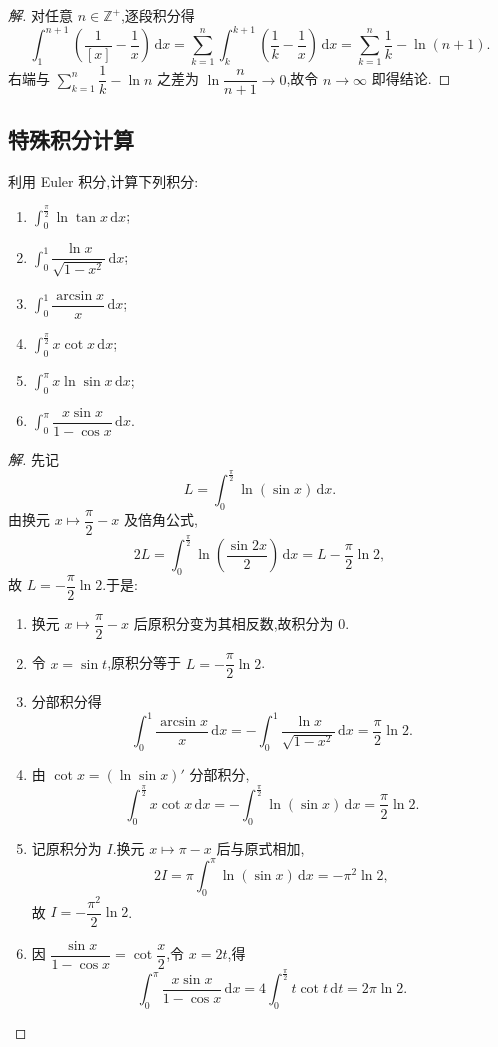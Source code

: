 \documentclass[../../数学分析培优讲义(答案版).tex]{subfiles}
\begin{document}
\begin{proof}[解]
对任意 $n\in\mathbb{Z}^+$,逐段积分得
\[
    \int_1^{n+1}\left(\dfrac{1}{[x]}-\dfrac{1}{x}\right)\,\mathrm{d}x
    =\sum\limits_{k=1}^{n}\int_k^{k+1}\left(\dfrac{1}{k}-\dfrac{1}{x}\right)\,\mathrm{d}x
    =\sum\limits_{k=1}^{n}\dfrac{1}{k}-\ln(n+1).
\]
右端与 $\displaystyle\sum\limits_{k=1}^{n}\dfrac{1}{k}-\ln n$ 之差为
$\ln\dfrac{n}{n+1}\to0$,故令 $n\to\infty$ 即得结论.
\end{proof}

\subsection{特殊积分计算}

\begin{example}
利用 Euler 积分,计算下列积分:
\begin{enumerate}[label=(\arabic*)]
    \item $\displaystyle\int_0^{\frac{\pi}{2}}\ln\tan x\,\mathrm{d}x$;
    \item $\displaystyle\int_0^1\dfrac{\ln x}{\sqrt{1-x^2}}\,\mathrm{d}x$;
    \item $\displaystyle\int_0^1\dfrac{\arcsin x}{x}\,\mathrm{d}x$;
    \item $\displaystyle\int_0^{\frac{\pi}{2}}x\cot x\,\mathrm{d}x$;
    \item $\displaystyle\int_0^\pi x\ln\sin x\,\mathrm{d}x$;
    \item $\displaystyle\int_0^\pi\dfrac{x\sin x}{1-\cos x}\,\mathrm{d}x$.
\end{enumerate}
\end{example}

\begin{proof}[解]
先记
\[
    L=\int_0^{\frac{\pi}{2}}\ln(\sin x)\,\mathrm{d}x.
\]
由换元 $x\mapsto\dfrac{\pi}{2}-x$ 及倍角公式,
\[
    2L=\int_0^{\frac{\pi}{2}}\ln\left(\dfrac{\sin2x}{2}\right)\,\mathrm{d}x
    =L-\dfrac{\pi}{2}\ln2,
\]
故 $L=-\dfrac{\pi}{2}\ln2$.于是:
\begin{enumerate}[label=(\arabic*)]
    \item 换元 $x\mapsto\dfrac{\pi}{2}-x$ 后原积分变为其相反数,故积分为 $0$.
    \item 令 $x=\sin t$,原积分等于 $L=-\dfrac{\pi}{2}\ln2$.
    \item 分部积分得
    \[
        \int_0^1\dfrac{\arcsin x}{x}\,\mathrm{d}x
        =-\int_0^1\dfrac{\ln x}{\sqrt{1-x^2}}\,\mathrm{d}x
        =\dfrac{\pi}{2}\ln2.
    \]
    \item 由 $\cot x=(\ln\sin x)'$ 分部积分,
    \[
        \int_0^{\frac{\pi}{2}}x\cot x\,\mathrm{d}x
        =-\int_0^{\frac{\pi}{2}}\ln(\sin x)\,\mathrm{d}x
        =\dfrac{\pi}{2}\ln2.
    \]
    \item 记原积分为 $I$.换元 $x\mapsto\pi-x$ 后与原式相加,
    \[
        2I=\pi\int_0^\pi\ln(\sin x)\,\mathrm{d}x=-\pi^2\ln2,
    \]
    故 $I=-\dfrac{\pi^2}{2}\ln2$.
    \item 因 $\dfrac{\sin x}{1-\cos x}=\cot\dfrac{x}{2}$,令 $x=2t$,得
    \[
        \int_0^\pi\dfrac{x\sin x}{1-\cos x}\,\mathrm{d}x
        =4\int_0^{\frac{\pi}{2}}t\cot t\,\mathrm{d}t
        =2\pi\ln2.
    \]
\end{enumerate}
\end{proof}
\end{document}
